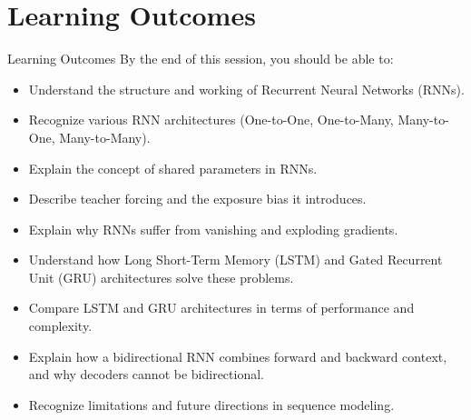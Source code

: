 \section{Learning Outcomes}
\begin{frame}{Learning Outcomes}
    By the end of this session, you should be able to:
    \begin{itemize}
        \item Understand the structure and working of Recurrent Neural Networks (RNNs).
        \item Recognize various RNN architectures (One-to-One, One-to-Many, Many-to-One, Many-to-Many).
        \item Explain the concept of shared parameters in RNNs.
        \item Describe teacher forcing and the exposure bias it introduces.
        \item Explain why RNNs suffer from vanishing and exploding gradients.
        \item Understand how Long Short-Term Memory (LSTM) and Gated Recurrent Unit (GRU) architectures solve these problems.
        \item Compare LSTM and GRU architectures in terms of performance and complexity.
        \item Explain how a bidirectional RNN combines forward and backward context, and why decoders cannot be bidirectional.
        \item Recognize limitations and future directions in sequence modeling.
    \end{itemize}
\end{frame}